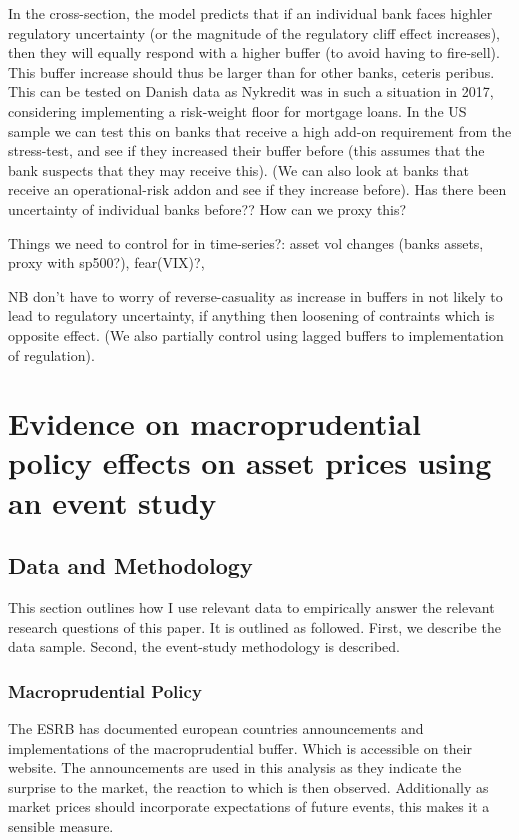 \documentclass[11pt]{article}
\begin{document}
In the cross-section, the model predicts that if an individual bank faces highler regulatory uncertainty (or the magnitude of the regulatory cliff effect increases), then they will equally respond with a higher buffer (to avoid having to fire-sell). This buffer increase should thus be larger than for other banks, ceteris peribus. This can be tested on Danish data as Nykredit was in such a situation in 2017, considering implementing a risk-weight floor for mortgage loans. In the US sample we can test this on banks that receive a high add-on requirement from the stress-test, and see if they increased their buffer before (this assumes that the bank suspects that they may receive this). (We can also look at banks that receive an operational-risk addon and see if they increase before). Has there been uncertainty of individual banks before?? How can we proxy this?

Things we need to control for in time-series?: asset vol changes (banks assets, proxy with sp500?), fear(VIX)?,

NB don't have to worry of reverse-casuality as increase in buffers in not likely to lead to regulatory uncertainty, if anything then loosening of contraints which is opposite effect. (We also partially control using lagged buffers to implementation of regulation).

\section{Evidence on macroprudential policy effects on asset prices using an event study} \label{sec:empiricalAnalysis}

\subsection{Data and Methodology}

This section outlines how I use relevant data to empirically answer the relevant research questions of this paper. It is outlined as followed. First, we describe the data sample. Second, the event-study methodology is described.

\subsubsection*{Macroprudential Policy}
The ESRB has documented european countries announcements and implementations of the macroprudential buffer. Which is accessible on their website. The announcements are used in this analysis as they indicate the surprise to the market, the reaction to which is then observed. Additionally as market prices should incorporate expectations of future events, this makes it a sensible measure.
\end{document}
